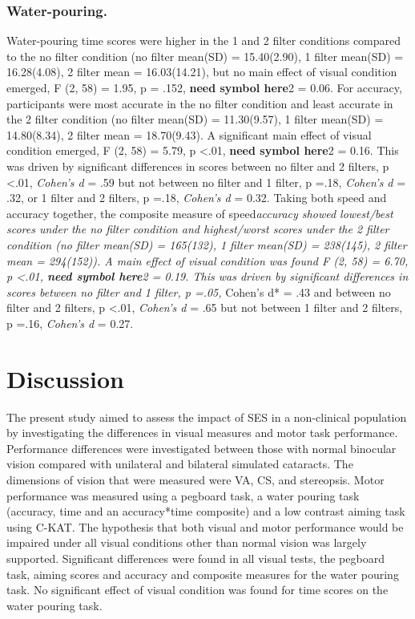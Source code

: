 \documentclass[
  english,
  man,floatsintext]{apa6}
\begin{document}
\hypertarget{water-pouring.}{%
\subsubsection{Water-pouring.}\label{water-pouring.}}

Water-pouring time scores were higher in the 1 and 2 filter conditions compared to the no filter condition (no filter mean(SD) = 15.40(2.90), 1 filter mean(SD) = 16.28(4.08), 2 filter mean = 16.03(14.21), but no main effect of visual condition emerged, F (2, 58) = 1.95, p = .152, \textbf{need symbol here}2 = 0.06.
For accuracy, participants were most accurate in the no filter condition and least accurate in the 2 filter condition (no filter mean(SD) = 11.30(9.57), 1 filter mean(SD) = 14.80(8.34), 2 filter mean = 18.70(9.43).
A significant main effect of visual condition emerged, F (2, 58) = 5.79, p \textless{}.01, \textbf{need symbol here}2 = 0.16.
This was driven by significant differences in scores between no filter and 2 filters, p \textless{}.01, \emph{Cohen's d} = .59 but not between no filter and 1 filter, p =.18, \emph{Cohen's d} = .32, or 1 filter and 2 filters, p =.18, \emph{Cohen's d} = 0.32.
Taking both speed and accuracy together, the composite measure of speed\emph{accuracy showed lowest/best scores under the no filter condition and highest/worst scores under the 2 filter condition (no filter mean(SD) = 165(132), 1 filter mean(SD) = 238(145), 2 filter mean = 294(152)).
A main effect of visual condition was found F (2, 58) = 6.70, p \textless{}.01, \textbf{need symbol here}2 = 0.19.
This was driven by significant differences in scores between no filter and 1 filter, p =.05, }Cohen's d* = .43 and between no filter and 2 filters, p \textless{}.01, \emph{Cohen's d} = .65 but not between 1 filter and 2 filters, p =.16, \emph{Cohen's d} = 0.27.

\hypertarget{discussion-1}{%
\section{Discussion}\label{discussion-1}}

The present study aimed to assess the impact of SES in a non-clinical population by investigating the differences in visual measures and motor task performance.
Performance differences were investigated between those with normal binocular vision compared with unilateral and bilateral simulated cataracts.
The dimensions of vision that were measured were VA, CS, and stereopsis. Motor performance was measured using a pegboard task, a water pouring task (accuracy, time and an accuracy*time composite) and a low contrast aiming task using C-KAT.
The hypothesis that both visual and motor performance would be impaired under all visual conditions other than normal vision was largely supported.
Significant differences were found in all visual tests, the pegboard task, aiming scores and accuracy and composite measures for the water pouring task.
No significant effect of visual condition was found for time scores on the water pouring task.
\end{document}

